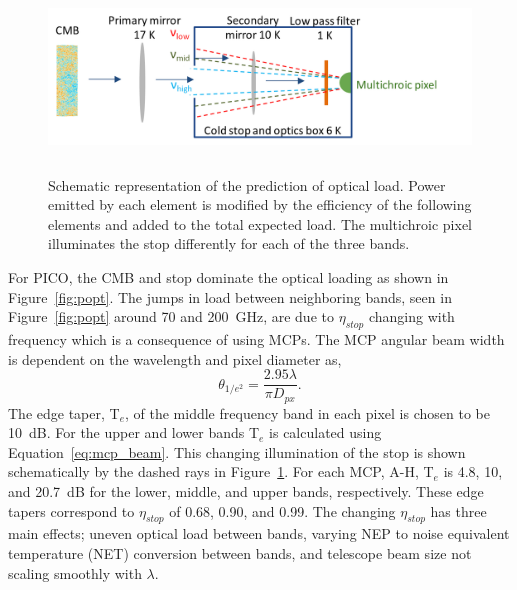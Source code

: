 \documentclass[]{spie}  %
\begin{document}
\begin{figure} [ht]
\begin{center}
\hspace{1cm} \includegraphics[height=5cm]{load_calc_MCP.png}
\end{center}
\caption[load] { \label{fig:load} 
Schematic representation of the prediction of optical load.  Power emitted by each element is modified by the efficiency of the following elements 
and added to the total expected load.  The multichroic pixel illuminates the stop differently for each of the three bands.
}
\end{figure} 
%

For PICO, the CMB and stop dominate the optical loading as shown in Figure~\ref{fig:popt}.  %
The jumps in load between neighboring bands, seen in Figure~\ref{fig:popt} around 70 and 200~GHz, are due to $\eta_{stop}$ changing with frequency 
which is a consequence of using MCPs.  
The MCP angular beam width is dependent on the wavelength and pixel diameter as,\cite{suzuki2013_thesis}
\begin{equation}
\label{eq:mcp_beam}
\theta_{1/e^2} = \frac{2.95 \lambda}{\pi D_{px}}. 
\end{equation} 
The edge taper, T$_e$, of the middle frequency band in each pixel is chosen to be 10~dB. For the upper and lower bands T$_e$ is calculated using 
Equation~\ref{eq:mcp_beam}. This changing illumination of the stop is shown schematically by the dashed rays in Figure~\ref{fig:load}. 
For each MCP, A-H, T$_e$ is 4.8, 10, and 20.7~dB for the lower, middle, and upper bands, respectively.  These 
edge tapers correspond to $\eta_{stop}$ of 0.68, 0.90, and 0.99.
The changing $\eta_{stop}$ has three main effects; uneven optical load between bands, varying NEP to noise equivalent temperature (NET) conversion 
between bands, and telescope beam size not scaling smoothly with $\lambda$.
\end{document}
